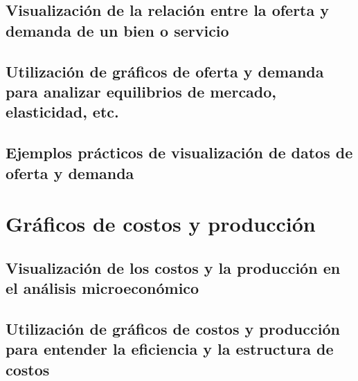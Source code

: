 \documentclass[
  a4paper,
]{article}
\begin{document}
\hypertarget{visualizaciuxf3n-de-la-relaciuxf3n-entre-la-oferta-y-demanda-de-un-bien-o-servicio}{%
\subsection{Visualización de la relación entre la oferta y demanda de un
bien o
servicio}\label{visualizaciuxf3n-de-la-relaciuxf3n-entre-la-oferta-y-demanda-de-un-bien-o-servicio}}

\hypertarget{utilizaciuxf3n-de-gruxe1ficos-de-oferta-y-demanda-para-analizar-equilibrios-de-mercado-elasticidad-etc.}{%
\subsection{Utilización de gráficos de oferta y demanda para analizar
equilibrios de mercado, elasticidad,
etc.}\label{utilizaciuxf3n-de-gruxe1ficos-de-oferta-y-demanda-para-analizar-equilibrios-de-mercado-elasticidad-etc.}}

\hypertarget{ejemplos-pruxe1cticos-de-visualizaciuxf3n-de-datos-de-oferta-y-demanda}{%
\subsection{Ejemplos prácticos de visualización de datos de oferta y
demanda}\label{ejemplos-pruxe1cticos-de-visualizaciuxf3n-de-datos-de-oferta-y-demanda}}

\hypertarget{gruxe1ficos-de-costos-y-producciuxf3n}{%
\section{Gráficos de costos y
producción}\label{gruxe1ficos-de-costos-y-producciuxf3n}}

\hypertarget{visualizaciuxf3n-de-los-costos-y-la-producciuxf3n-en-el-anuxe1lisis-microeconuxf3mico}{%
\subsection{Visualización de los costos y la producción en el análisis
microeconómico}\label{visualizaciuxf3n-de-los-costos-y-la-producciuxf3n-en-el-anuxe1lisis-microeconuxf3mico}}

\hypertarget{utilizaciuxf3n-de-gruxe1ficos-de-costos-y-producciuxf3n-para-entender-la-eficiencia-y-la-estructura-de-costos}{%
\subsection{Utilización de gráficos de costos y producción para entender
la eficiencia y la estructura de
costos}\label{utilizaciuxf3n-de-gruxe1ficos-de-costos-y-producciuxf3n-para-entender-la-eficiencia-y-la-estructura-de-costos}}
\end{document}
